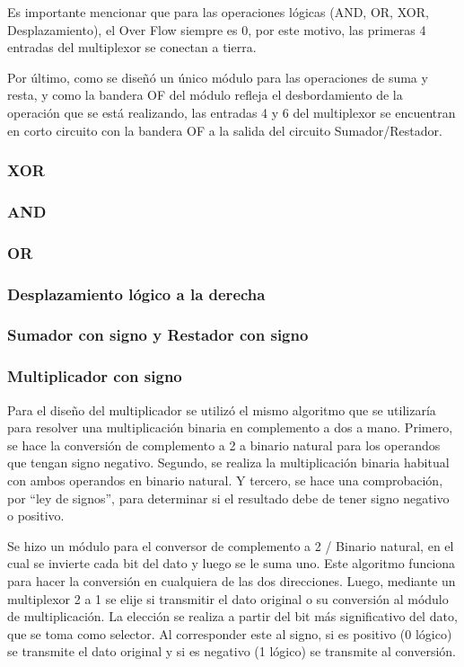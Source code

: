 \documentclass[journal,trans]{IEEEtran}
\begin{document}
Es importante mencionar que para las operaciones lógicas (AND, OR, XOR, Desplazamiento), el Over Flow siempre es 0, por este motivo, las primeras 4 entradas del multiplexor se conectan a tierra. 

Por último, como se diseñó un único módulo para las operaciones de suma y resta, y como la bandera OF del módulo refleja el desbordamiento de la operación que se está realizando, las entradas 4 y 6 del multiplexor se encuentran en corto circuito con la bandera OF a la salida del circuito Sumador/Restador.

\subsubsection{XOR}

\subsubsection{AND}

\subsubsection{OR}

\subsubsection{Desplazamiento lógico a la derecha}

\subsubsection{Sumador con signo y Restador con signo}

\subsubsection{Multiplicador con signo}
Para el diseño del multiplicador se utilizó el mismo algoritmo que se utilizaría para resolver una multiplicación binaria en complemento a dos a mano. Primero, se hace la conversión de complemento a 2 a binario natural para los operandos que tengan signo negativo. Segundo, se realiza la multiplicación binaria habitual con ambos operandos en binario natural. Y tercero, se hace una comprobación, por “ley de signos”, para determinar si el resultado debe de tener signo negativo o positivo.

Se hizo un módulo para el conversor de complemento a 2 / Binario natural, en el cual se invierte cada bit del dato y luego se le suma uno. Este algoritmo funciona para hacer la conversión en cualquiera de las dos direcciones. Luego, mediante un multiplexor 2 a 1 se elije si transmitir el dato original o su conversión al módulo de multiplicación. La elección se realiza a partir del bit más significativo del dato, que se toma como selector. Al corresponder este al signo, si es positivo (0 lógico) se transmite el dato original y si es negativo (1 lógico) se transmite al conversión.
\end{document}
